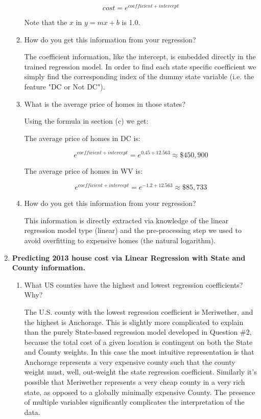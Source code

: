 \documentclass[12pt]{article}
\begin{document}
\begin{enumerate}[leftmargin=\labelsep]
\begin{enumerate}[label=(\alph*)]
      \[ cost = e^{coefficient + intercept} \]

    Note that the \(x\) in \(y = mx + b\) is 1.0.

  \item How do you get this information from your regression?

    The coefficient information, like the intercept, is embedded directly in the trained regression model. In order to find each state specific coefficient we simply find the corresponding index of the dummy state variable (i.e. the feature "DC or Not DC").

  \item What is the average price of homes in those states?

    Using the formula in section (c) we get:

    The average price of homes in DC is:

      \[ e^{coefficient + intercept} = e^{0.45 + 12.563} \approx \$450,900 \]

    The average price of homes in WV is:

      \[ e^{coefficient + intercept} = e^{-1.2 + 12.563} \approx \$85,733 \]

  \item How do you get this information from your regression?

    This information is directly extracted via knowledge of the linear regression model type (linear) and the pre-processing step we used to avoid overfitting to expensive homes (the natural logarithm).

  \end{enumerate}

\item \textbf{Predicting 2013 house cost via Linear Regression with State and County information.}

  \begin{enumerate}[label=(\alph*)]
  \item What US counties have the highest and lowest regression coefficients? Why?

    The U.S. county with the lowest regression coefficient is Meriwether, and the highest is Anchorage. This is slightly more complicated to explain than the purely State-based regression model developed in Question \#2, because the total cost of a given location is contingent on both the State and County weights. In this case the most intuitive representation is that Anchorage represents a very expensive county such that the county weight must, well, out-weight the state regression coefficient. Similarly it's possible that Meriwether represents a very cheap county in a very rich state, as opposed to a globally minimally expensive County. The presence of multiple variables significantly complicates the interpretation of the data.


\end{enumerate}
\end{enumerate}
\end{document}

